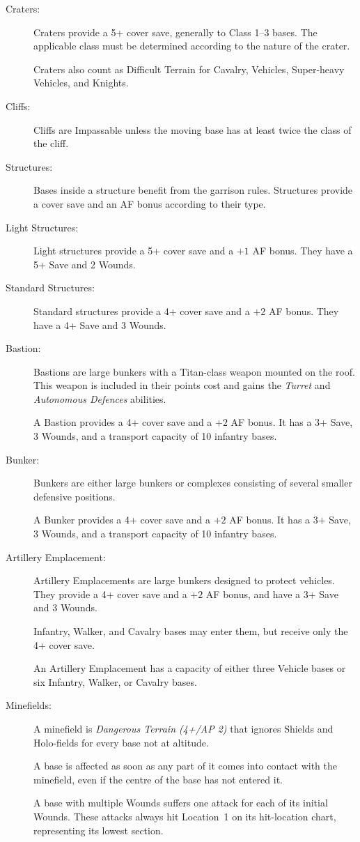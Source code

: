 \begin{description}
    \item[Craters:] Craters provide a 5+ cover save, generally to Class 1--3 bases. The applicable class must be determined according to the nature of the crater.

    Craters also count as Difficult Terrain for Cavalry, Vehicles, Super-heavy Vehicles, and Knights.

    \item[Cliffs:] Cliffs are Impassable unless the moving base has at least twice the class of the cliff.

    \item[Structures:] Bases inside a structure benefit from the garrison rules. Structures provide a cover save and an AF bonus according to their type.

    \item[Light Structures:] Light structures provide a 5+ cover save and a $+1$ AF bonus. They have a 5+ Save and 2 Wounds.

    \item[Standard Structures:] Standard structures provide a 4+ cover save and a $+2$ AF bonus. They have a 4+ Save and 3 Wounds.

    \item[Bastion:] Bastions are large bunkers with a Titan-class weapon mounted on the roof. This weapon is included in their points cost and gains the \textit{Turret} and \textit{Autonomous Defences} abilities.

    A Bastion provides a 4+ cover save and a $+2$ AF bonus. It has a 3+ Save, 3 Wounds, and a transport capacity of 10 infantry bases.

    \item[Bunker:] Bunkers are either large bunkers or complexes consisting of several smaller defensive positions.

    A Bunker provides a 4+ cover save and a $+2$ AF bonus. It has a 3+ Save, 3 Wounds, and a transport capacity of 10 infantry bases.

    \item[Artillery Emplacement:] Artillery Emplacements are large bunkers designed to protect vehicles. They provide a 4+ cover save and a $+2$ AF bonus, and have a 3+ Save and 3 Wounds.

    Infantry, Walker, and Cavalry bases may enter them, but receive only the 4+ cover save.

    An Artillery Emplacement has a capacity of either three Vehicle bases or six Infantry, Walker, or Cavalry bases.

    \item[Minefields:] A minefield is \textit{Dangerous Terrain (4+/AP 2)} that ignores Shields and Holo-fields for every base not at altitude.

    A base is affected as soon as any part of it comes into contact with the minefield, even if the centre of the base has not entered it.

    A base with multiple Wounds suffers one attack for each of its initial Wounds. These attacks always hit Location~1 on its hit-location chart, representing its lowest section.
\end{description}


